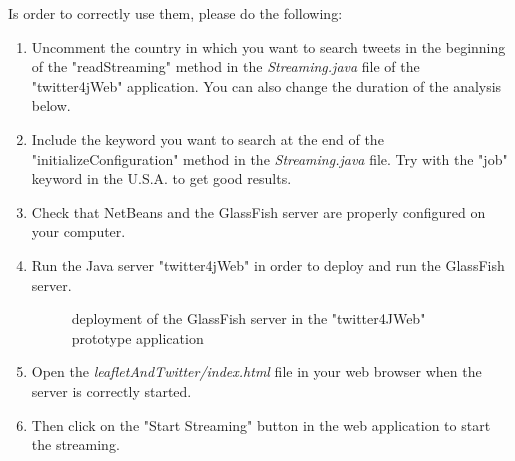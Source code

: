 \documentclass[a4paper,11pt]{report}
\begin{document}
Is order to correctly use them, please do the following:
\begin{enumerate}
	\item Uncomment the country in which you want to search tweets in the beginning of the "readStreaming" method in the \emph{Streaming.java} file of the "twitter4jWeb" application. You can also change the duration of the analysis below.
	\item Include the keyword you want to search at the end of the "initializeConfiguration" method in the \emph{Streaming.java} file. Try with the "job" keyword in the U.S.A. to get good results.
	\item Check that NetBeans and the GlassFish server are properly configured on your computer.
	\item Run the Java server "twitter4jWeb" in order to deploy and run the GlassFish server.
	\begin{figure}[H]
	\vspace{-5pt}
	\begin{center}
	\vspace{-5pt}
	\caption{deployment of the GlassFish server in the "twitter4JWeb" prototype application}
	\end{center}
	\end{figure}
	\vspace{-20pt}
	\item Open the \emph{leafletAndTwitter/index.html} file in your web browser when the server is correctly started.
	\item Then click on the "Start Streaming" button in the web application to start the streaming.
	\begin{figure}[H]
	\vspace{-5pt}
	\begin{center}

\end{center}
\end{figure}
\end{enumerate}
\end{document}
